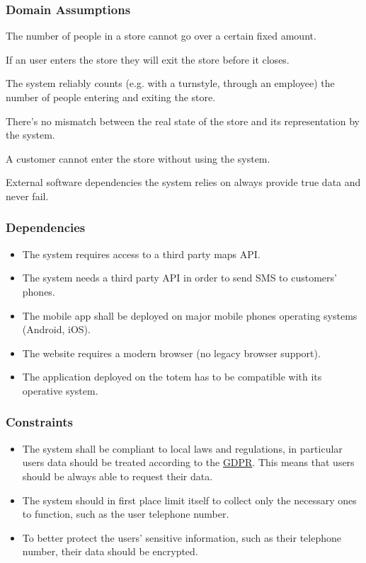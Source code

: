 \subsubsection{Domain Assumptions}
\begin{enumerate}[label={[D\arabic*]}]
    \item The number of people in a store cannot go over a certain fixed amount.
    \item If an user enters the store they will exit the store before it closes.
    \item The system reliably counts (e.g. with a turnstyle, through an employee) the number of people entering and exiting the store.
    \item There's no mismatch between the real state of the store and its representation by the system.
    \item A customer cannot enter the store without using the system.
    \item External software dependencies the system relies on always provide true data and never fail.
\end{enumerate}

\subsubsection{Dependencies}
\begin{itemize}
    \item The system requires access to a third party maps API.
    \item The system needs a third party API in order to send SMS to customers' phones.
    \item The mobile app shall be deployed on major mobile phones operating systems (Android, iOS).
    \item The website requires a modern browser (no legacy browser support).
    \item The application deployed on the totem has to be compatible with its operative system.
\end{itemize}

\subsubsection{Constraints}
\begin{itemize}
    \item The system shall be compliant to local laws and regulations, in particular users data should
    be treated according to the \href{https://gdpr.eu/}{GDPR}. This means that users should be always able
    to request their data.
    \item The system should in first place limit itself to collect only
    the necessary ones to function, such as the user telephone number.
    \item To better protect the users' sensitive information, such as their telephone number, their data should
    be encrypted.
\end{itemize}